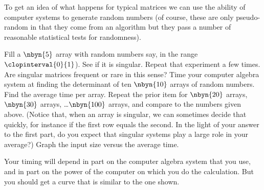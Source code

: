 \begin{exercises}
  \item 
    To get an idea of what happens for typical matrices
    we can use the ability of computer systems to generate random numbers
    (of course, these are only pseudo-random in that they come from
    an algorithm but they 
    pass a number of reasonable statistical tests for randomness).
    \begin{exparts}
      \partsitem Fill a $\nbyn{5}$ array with random numbers say, in the
        range $\clopinterval{0}{1}$).
        See if it is singular.
        Repeat that experiment a few times.
        Are singular matrices frequent or rare in this sense?
      \partsitem Time your computer algebra system at finding the
        determinant of ten $\nbyn{10}$ arrays of random numbers.
        Find the average time per array.
        Repeat the prior item for $\nbyn{20}$ arrays,
        $\nbyn{30}$ arrays, \ldots $\nbyn{100}$ arrays, 
        and compare to the numbers given above.
        (Notice that, when an array is singular, we can sometimes decide that
        quickly,
        for instance if the first row equals the second.
        In the light of your answer to the first part, do you expect that 
        singular systems play a large role in your average?)
      \partsitem Graph the input size versus the average time.
    \end{exparts}
    \begin{answer}
      Your timing will depend in part on the computer algebra system
      that you use, and in part on the power of the computer on which
      you do the calculation.
      But you should get a curve that is similar to the one shown.


\end{answer}
\end{exercises}
